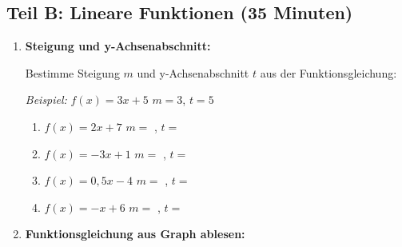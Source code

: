 \subsection*{Teil B: Lineare Funktionen (35 Minuten)}

\begin{enumerate}[label=\arabic*.,resume]

    \item \textbf{Steigung und y-Achsenabschnitt:}

    Bestimme Steigung $m$ und y-Achsenabschnitt $t$ aus der Funktionsgleichung:

    \textit{Beispiel:} $f(x) = 3x + 5$ \hspace{2cm} $m = 3$, $t = 5$

    \vspace{0.5cm}
    \begin{enumerate}[label=\alph*)]
        \item $f(x) = 2x + 7$ \hspace{3cm} $m = $ \underline{\hspace{2cm}}, $t = $ \underline{\hspace{2cm}}

        \item $f(x) = -3x + 1$ \hspace{3cm} $m = $ \underline{\hspace{2cm}}, $t = $ \underline{\hspace{2cm}}

        \item $f(x) = 0,5x - 4$ \hspace{3cm} $m = $ \underline{\hspace{2cm}}, $t = $ \underline{\hspace{2cm}}

        \item $f(x) = -x + 6$ \hspace{3cm} $m = $ \underline{\hspace{2cm}}, $t = $ \underline{\hspace{2cm}}
    \end{enumerate}

    \vspace{1cm}

    \item \textbf{Funktionsgleichung aus Graph ablesen:}

    \begin{center}
    \end{center}


\end{enumerate}
